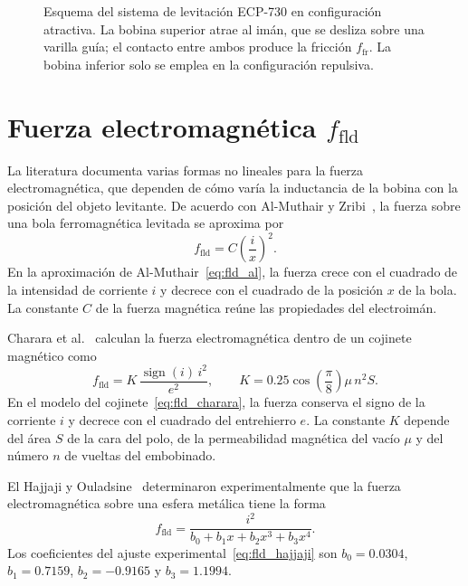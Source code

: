\begin{figure}[ht]
    \centering
    
    \caption[Esquema del ECP-730 en configuración atractiva]{Esquema del sistema de levitación ECP-730 en configuración atractiva. La bobina superior atrae al imán, que se desliza sobre una varilla guía; el contacto entre ambos produce la fricción $f_{\text{fr}}$. La bobina inferior solo se emplea en la configuración repulsiva.}
    \label{fig:dispositivo}
\end{figure}

\section{\texorpdfstring{Fuerza electromagnética $f_{\text{fld}}$}{Fuerza electromagnética}}\label{sec:fuerza}

La literatura documenta varias formas no lineales para la fuerza electromagnética, que dependen de cómo varía la inductancia de la bobina con la posición del objeto levitante. De acuerdo con Al-Muthair y Zribi~\cite{al}, la fuerza sobre una bola ferromagnética levitada se aproxima por
\begin{equation}
f_{\text{fld}} = C\left(\dfrac{i}{x}\right)^2 .
\label{eq:fld_al}
\end{equation}
En la aproximación de Al-Muthair~\eqref{eq:fld_al}, la fuerza crece con el cuadrado de la intensidad de corriente $i$ y decrece con el cuadrado de la posición $x$ de la bola. La constante $C$ de la fuerza magnética reúne las propiedades del electroimán.

Charara et al.~\cite{charara} calculan la fuerza electromagnética dentro de un cojinete magnético como
\begin{equation}
f_{\text{fld}} = K\,\frac{\operatorname{sign}(i)\,i^{2}}{e^{2}},
\qquad
K = 0.25 \cos\!\left(\frac{\pi}{8}\right)\!\mu\, n^{2} S .
\label{eq:fld_charara}
\end{equation}
En el modelo del cojinete~\eqref{eq:fld_charara}, la fuerza conserva el signo de la corriente $i$ y decrece con el cuadrado del entrehierro $e$. La constante $K$ depende del área $S$ de la cara del polo, de la permeabilidad magnética del vacío $\mu$ y del número $n$ de vueltas del embobinado.

El Hajjaji y Ouladsine~\cite{el} determinaron experimentalmente que la fuerza electromagnética sobre una esfera metálica tiene la forma
\begin{equation}
f_{\text{fld}} = \dfrac{i^{2}}{b_0 + b_1x + b_2x^3 + b_3x^4} .
\label{eq:fld_hajjaji}
\end{equation}
Los coeficientes del ajuste experimental~\eqref{eq:fld_hajjaji} son $b_0=0.0304$, $b_1=0.7159$, $b_2=-0.9165$ y $b_3=1.1994$.

